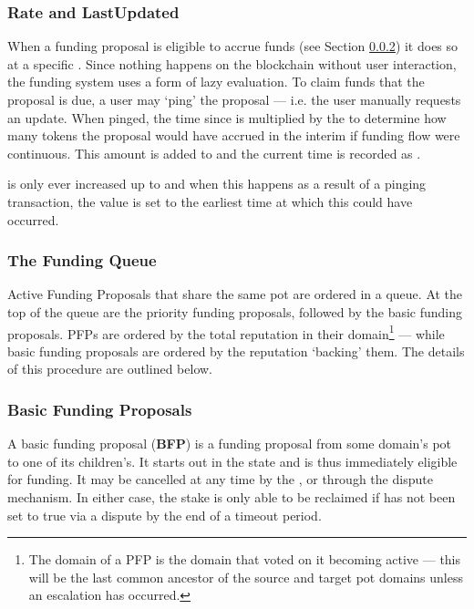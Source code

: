 \subsubsection{Rate and LastUpdated}
When a funding proposal is eligible to accrue funds (see Section \ref{subsec:funding-queue}) it does so at a specific . Since nothing happens on the blockchain without user interaction, the funding system uses a form of lazy evaluation. To claim funds that the proposal is due, a user may `ping' the proposal --- i.e. the user manually requests an update. When pinged, the time since  is multiplied by the  to determine how many tokens the proposal would have accrued in the interim if funding flow were continuous. This amount is added to  and the current time is recorded as .

 is only ever increased up to  and when this happens as a result of a pinging transaction, the  value is set to the earliest time at which this could have occurred.

\subsubsection{The Funding Queue}\label{subsec:funding-queue}
Active Funding Proposals that share the same  pot are ordered in a queue. At the top of the queue are the priority funding proposals, followed by the basic funding proposals. PFPs are ordered by the total reputation in their domain\footnote{The domain of a PFP is the domain that voted on it becoming active --- this will be the last common ancestor of the source and target pot domains unless an escalation has occurred.} --- while basic funding proposals are ordered by the reputation `backing' them.  The details of this procedure are outlined below.

%
%
%

\subsubsection{Basic Funding Proposals}\label{subsubsec:BFPs}
A basic funding proposal (\textbf{BFP}) is a funding proposal from some domain's pot to one of its children's. It starts out in the  state and is thus immediately eligible for funding. It may be cancelled at any time by the , or through the dispute mechanism. In either case, the stake is only able to be reclaimed if  has not been set to true via a dispute by the end of a timeout period.

